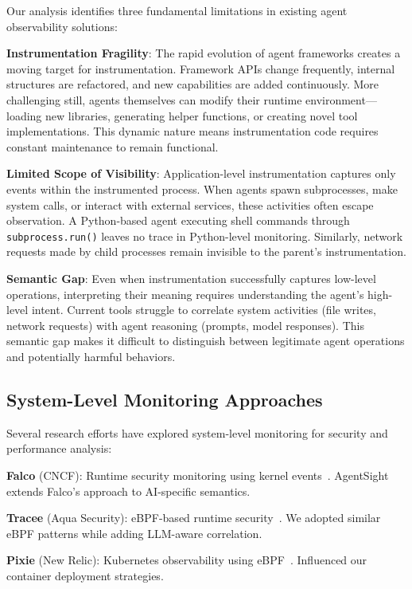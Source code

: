 \documentclass[sigplan,screen，review,9pt]{acmart}
\begin{document}
Our analysis identifies three fundamental limitations in existing agent observability solutions:

\textbf{Instrumentation Fragility}: The rapid evolution of agent frameworks creates a moving target for instrumentation. Framework APIs change frequently, internal structures are refactored, and new capabilities are added continuously. More challenging still, agents themselves can modify their runtime environment—loading new libraries, generating helper functions, or creating novel tool implementations. This dynamic nature means instrumentation code requires constant maintenance to remain functional.

\textbf{Limited Scope of Visibility}: Application-level instrumentation captures only events within the instrumented process. When agents spawn subprocesses, make system calls, or interact with external services, these activities often escape observation. A Python-based agent executing shell commands through \texttt{subprocess.run()} leaves no trace in Python-level monitoring. Similarly, network requests made by child processes remain invisible to the parent's instrumentation.

\textbf{Semantic Gap}: Even when instrumentation successfully captures low-level operations, interpreting their meaning requires understanding the agent's high-level intent. Current tools struggle to correlate system activities (file writes, network requests) with agent reasoning (prompts, model responses). This semantic gap makes it difficult to distinguish between legitimate agent operations and potentially harmful behaviors.

\subsection{System-Level Monitoring Approaches}

Several research efforts have explored system-level monitoring for security and performance analysis:

\textbf{Falco} (CNCF): Runtime security monitoring using kernel events~\cite{falco}. AgentSight extends Falco's approach to AI-specific semantics.

\textbf{Tracee} (Aqua Security): eBPF-based runtime security~\cite{tracee}. We adopted similar eBPF patterns while adding LLM-aware correlation.

\textbf{Pixie} (New Relic): Kubernetes observability using eBPF~\cite{pixie}. Influenced our container deployment strategies.
\end{document}
